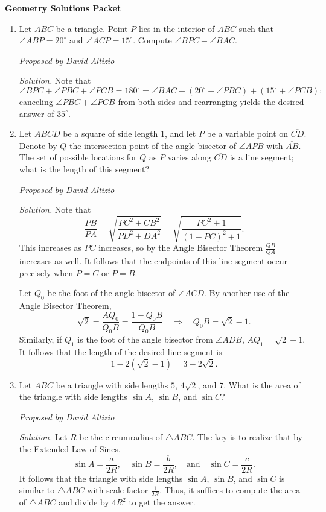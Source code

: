 \documentclass[10pt]{article}
\newcommand{\proposed}[1]
{
\vspace{5pt}
\noindent\textit{Proposed by #1}
}
\newcommand{\solution}
{
\vspace{5pt}
\noindent\textit{Solution.}\qquad
}
\begin{document}
\begin{center}
\huge\textbf{Geometry Solutions Packet}\normalsize

\vspace{3pt}
\end{center}

\begin{enumerate}
\item Let $ABC$ be a triangle.  Point $P$ lies in the interior of $ABC$ such that $\angle ABP = 20^\circ$ and $\angle ACP = 15^\circ$.  Compute $\angle BPC - \angle BAC$.

\proposed{David Altizio}

\solution Note that \[\angle BPC + \angle PBC + \angle PCB = 180^\circ = \angle BAC + (20^\circ + \angle PBC) + (15^\circ + \angle PCB);\] canceling $\angle PBC + \angle PCB$ from both sides and rearranging yields the desired answer of $\boxed{35^\circ}$.


\item Let $ABCD$ be a square of side length $1$, and let $P$ be a variable point on $\overline{CD}$.  Denote by $Q$ the intersection point of the angle bisector of $\angle APB$ with $\overline{AB}$.  The set of possible locations for $Q$ as $P$ varies along $\overline{CD}$ is a line segment; what is the length of this segment?

\proposed{David Altizio}

\solution Note that \[\frac{PB}{PA} = \sqrt{\frac{PC^2 + CB^2}{PD^2 + DA^2}} = \sqrt{\frac{PC^2 + 1}{(1-PC)^2 + 1}}.\] This increases as $PC$ increases, so by the Angle Bisector Theorem $\frac{QB}{QA}$ increases as well.  It follows that the endpoints of this line segment occur precisely when $P=C$ or $P=B$. 

\par Let $Q_0$ be the foot of the angle bisector of $\angle ACD$.  By another use of the Angle Bisector Theorem, \[\sqrt 2 = \frac{AQ_0}{Q_0B} = \frac{1-Q_0B}{Q_0B}\quad\Rightarrow\quad Q_0B = \sqrt 2 - 1.\] Similarly, if $Q_1$ is the foot of the angle bisector from $\angle ADB$, $AQ_1 = \sqrt 2 - 1$.  It follows that the length of the desired line segment is \[1 - 2(\sqrt 2 - 1) = \boxed{3 - 2\sqrt 2}. \]

\item Let $ABC$ be a triangle with side lengths $5$, $4\sqrt 2$, and $7$.  What is the area of the triangle with side lengths $\sin A$, $\sin B$, and $\sin C$?

\proposed{David Altizio}

\solution Let $R$ be the circumradius of $\triangle ABC$.  The key is to realize that by the Extended Law of Sines, \[\sin A = \frac{a}{2R},\quad \sin B = \frac{b}{2R},\quad \text{and}\quad \sin C = \frac{c}{2R}.\] It follows that the triangle with side lengths $\sin A$, $\sin B$, and $\sin C$ is similar to $\triangle ABC$ with scale factor $\tfrac{1}{2R}$.  Thus, it suffices to compute the area of $\triangle ABC$ and divide by $4R^2$ to get the answer.


\end{enumerate}
\end{document}

